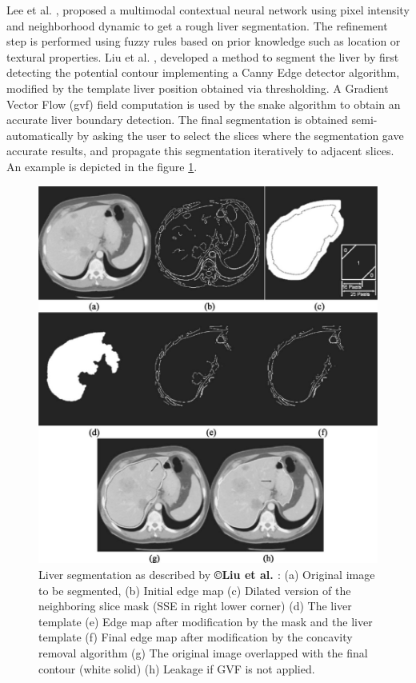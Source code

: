 Lee et al. \cite{Lee2003}, proposed a multimodal contextual neural network using
pixel intensity and neighborhood dynamic to get a rough liver
segmentation. The refinement step is performed using fuzzy rules based
on prior knowledge such as location or textural properties.
Liu et al. \cite{Liu2005}, developed a method to segment the liver by first detecting the potential
contour implementing a Canny Edge detector algorithm, modified by the
template liver position obtained via thresholding. A Gradient Vector
Flow (\ac{gvf}) field computation is used by the snake algorithm to obtain an
accurate liver boundary detection. The final segmentation is obtained
semi-automatically by asking the user to select the slices where the
segmentation gave accurate results, and propagate this segmentation
iteratively to adjacent slices. An example is depicted in the figure \ref{LiuGVF}.
\begin{figure} [ht!]
	\centering
	\includegraphics[width=0.6\linewidth]{images/Liu2005_Fig6}
	\caption{Liver segmentation as described by \textbf{©Liu et al. \cite{Liu2005}} : (a) Original image to be segmented, (b) Initial edge map (c) Dilated version of the neighboring slice mask (SSE in right lower corner) (d) The liver template (e) Edge map after modification by the mask and the liver template (f) Final edge map after modification by the concavity removal algorithm (g) The original image overlapped with the final contour (white solid) (h) Leakage if GVF is not applied.}
	\label{LiuGVF}
\end{figure}



